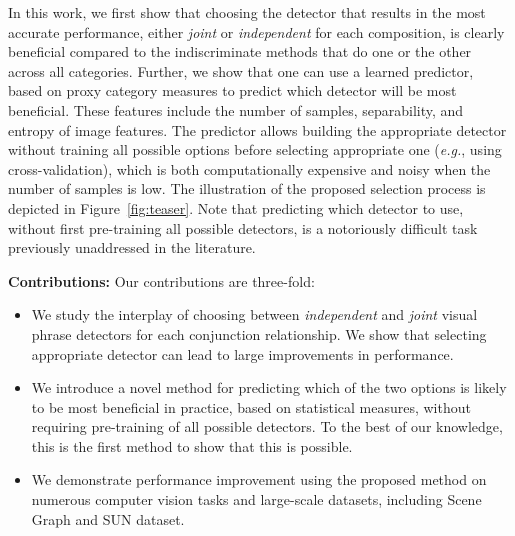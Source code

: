 \documentclass[runningheads]{llncs}
\makeatletter
\newcommand{\Guy} [1]{{\color{RoyalBlue}{#1}}}
\newcommand*{\eg}{{\em e.g.}\@\xspace}
\makeatother
\begin{document}
In this work, we first show that choosing the detector that results in the most accurate performance, either {\em joint} or {\em independent} for each composition, is clearly beneficial compared to the indiscriminate methods that do one or the other across all categories. Further, we show that one can use a learned predictor, based on proxy category measures to predict which detector will be most beneficial. These features include the number of samples, separability, and entropy of image features. The predictor allows building the appropriate detector without training all possible options before selecting appropriate one (\eg, using cross-validation), which is both computationally expensive and noisy when the number of samples is low. The illustration of the proposed selection process is depicted in Figure~\ref{fig:teaser}. Note that predicting which detector to use, without first pre-training all possible detectors, is a notoriously difficult task previously unaddressed in the literature.  


\vspace{0.1in}
\noindent
{\bf Contributions:} Our contributions are three-fold:
\begin{itemize}
\item We study the interplay of choosing between {\em independent} and {\em joint} visual phrase detectors for each conjunction relationship. We show that selecting appropriate detector can lead to large improvements in performance. 
\item We introduce a novel method for predicting which of the two options is likely to be most beneficial in practice, based on statistical measures, without requiring pre-training of all possible detectors. To the best of our knowledge, this is the first method to show that this is possible.
\item We demonstrate performance improvement using the proposed method on numerous computer vision tasks and large-scale datasets, including Scene Graph \cite{Johnson2015} and SUN \cite{patterson2014sun} dataset.
\end{itemize}
\end{document}
